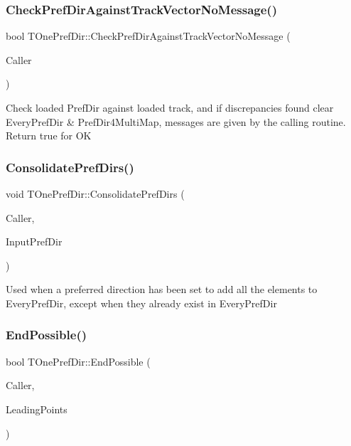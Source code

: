 \subsubsection{\texorpdfstring{Check\+Pref\+Dir\+Against\+Track\+Vector\+No\+Message()}{CheckPrefDirAgainstTrackVectorNoMessage()}}
{\footnotesize\ttfamily bool T\+One\+Pref\+Dir\+::\+Check\+Pref\+Dir\+Against\+Track\+Vector\+No\+Message (\begin{DoxyParamCaption}\item[{int}]{Caller }\end{DoxyParamCaption})}

Check loaded Pref\+Dir against loaded track, and if discrepancies found clear Every\+Pref\+Dir \& Pref\+Dir4\+Multi\+Map, messages are given by the calling routine. Return true for OK \mbox{\label{class_t_one_pref_dir_a65df51092983945e1fe3c20bf8917a39}} 
\subsubsection{\texorpdfstring{Consolidate\+Pref\+Dirs()}{ConsolidatePrefDirs()}}
{\footnotesize\ttfamily void T\+One\+Pref\+Dir\+::\+Consolidate\+Pref\+Dirs (\begin{DoxyParamCaption}\item[{int}]{Caller,  }\item[{\mbox{\hyperlink{class_t_one_pref_dir}{T\+One\+Pref\+Dir}} $\ast$}]{Input\+Pref\+Dir }\end{DoxyParamCaption})}

Used when a preferred direction has been set to add all the elements to Every\+Pref\+Dir, except when they already exist in Every\+Pref\+Dir \mbox{\label{class_t_one_pref_dir_a7b81a1377e6269aafad6c25c929b2852}} 
\subsubsection{\texorpdfstring{End\+Possible()}{EndPossible()}}
{\footnotesize\ttfamily bool T\+One\+Pref\+Dir\+::\+End\+Possible (\begin{DoxyParamCaption}\item[{int}]{Caller,  }\item[{bool \&}]{Leading\+Points }\end{DoxyParamCaption})}

